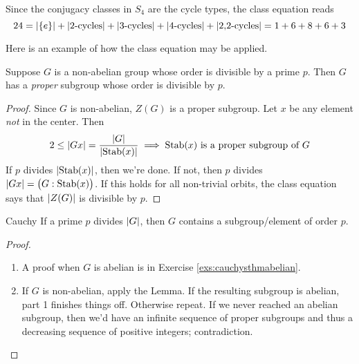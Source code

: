 \begin{example}{}{}
	Since the conjugacy classes in $S_4$ are the cycle types, the class equation reads
	\[
		24=\left| \{e\}\right| +\left| \text{2-cycles}\right| +\left| \text{3-cycles}\right| +\left| \text{4-cycles}\right| +\left| \text{2,2-cycles}\right|
		=1+6+8+6+3
	\]
\end{example}

Here is an example of how the class equation may be applied.

\begin{lemm}{}{}
	Suppose $G$ is a non-abelian group whose order is divisible by a prime $p$. Then $G$ has a \emph{proper} subgroup whose order is divisible by $p$.
\end{lemm}

\begin{proof}
	Since $G$ is non-abelian, $Z(G)$ is a proper subgroup. Let $x$ be any element \emph{not} in the center. Then
	\[
		2\le \left| Gx\right|=\frac{\left| G\right|}{\left| \operatorname{Stab}(x)\right|} 
		\implies \operatorname{Stab}(x)\text{ is a proper subgroup of }G
	\]
	If $p$ divides $\left| \operatorname{Stab}(x)\right|$, then we're done. If not, then $p$ divides $\left| Gx\right|=\bigl(G:\operatorname{Stab}(x)\bigr)$. If this holds for all non-trivial orbits, the class equation says that $\left| Z(G)\right|$ is divisible by $p$.
\end{proof}


\begin{thm}{Cauchy}{}
	If a prime $p$ divides $\left| G\right|$, then $G$ contains a subgroup/element of order $p$. 
\end{thm}

% 
% 


\begin{proof}
	\begin{enumerate}
	  \item A proof when $G$ is abelian is in Exercise \ref{exs:cauchysthmabelian}.
	  \item If $G$ is non-abelian, apply the Lemma. If the resulting subgroup is abelian, part 1 finishes things off. Otherwise repeat. If we never reached an abelian subgroup, then we'd have an infinite sequence of proper subgroups and thus a decreasing sequence of positive integers; contradiction.\qedhere
	\end{enumerate}
\end{proof}


